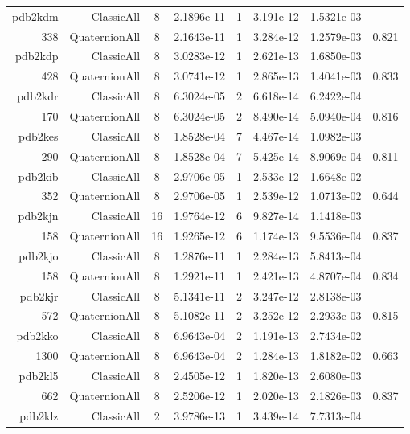 \begin{xltabular}{\textwidth}{r|rcS[table-format=1.4e+2]cS[table-format=1.3e+2]S[table-format=1.4e+2]S[table-format=-1.3]}
pdb2kdm & ClassicAll & 8 & 2.1896e-11 & 1 & 3.191e-12 & 1.5321e-03 & \\
338 & QuaternionAll & 8 & 2.1643e-11 & 1 & 3.284e-12 & 1.2579e-03 & 0.821\\  \addlinespace
pdb2kdp & ClassicAll & 8 & 3.0283e-12 & 1 & 2.621e-13 & 1.6850e-03 & \\
428 & QuaternionAll & 8 & 3.0741e-12 & 1 & 2.865e-13 & 1.4041e-03 & 0.833\\  \addlinespace
pdb2kdr & ClassicAll & 8 & 6.3024e-05 & 2 & 6.618e-14 & 6.2422e-04 & \\
170 & QuaternionAll & 8 & 6.3024e-05 & 2 & 8.490e-14 & 5.0940e-04 & 0.816\\  \addlinespace
pdb2kes & ClassicAll & 8 & 1.8528e-04 & 7 & 4.467e-14 & 1.0982e-03 & \\
290 & QuaternionAll & 8 & 1.8528e-04 & 7 & 5.425e-14 & 8.9069e-04 & 0.811\\  \addlinespace
pdb2kib & ClassicAll & 8 & 2.9706e-05 & 1 & 2.533e-12 & 1.6648e-02 & \\
352 & QuaternionAll & 8 & 2.9706e-05 & 1 & 2.539e-12 & 1.0713e-02 & 0.644\\  \addlinespace
pdb2kjn & ClassicAll & 16 & 1.9764e-12 & 6 & 9.827e-14 & 1.1418e-03 & \\
158 & QuaternionAll & 16 & 1.9265e-12 & 6 & 1.174e-13 & 9.5536e-04 & 0.837\\  \addlinespace
pdb2kjo & ClassicAll & 8 & 1.2876e-11 & 1 & 2.284e-13 & 5.8413e-04 & \\
158 & QuaternionAll & 8 & 1.2921e-11 & 1 & 2.421e-13 & 4.8707e-04 & 0.834\\  \addlinespace
pdb2kjr & ClassicAll & 8 & 5.1341e-11 & 2 & 3.247e-12 & 2.8138e-03 & \\
572 & QuaternionAll & 8 & 5.1082e-11 & 2 & 3.252e-12 & 2.2933e-03 & 0.815\\  \addlinespace
pdb2kko & ClassicAll & 8 & 6.9643e-04 & 2 & 1.191e-13 & 2.7434e-02 & \\
1300 & QuaternionAll & 8 & 6.9643e-04 & 2 & 1.284e-13 & 1.8182e-02 & 0.663\\  \addlinespace
pdb2kl5 & ClassicAll & 8 & 2.4505e-12 & 1 & 1.820e-13 & 2.6080e-03 & \\
662 & QuaternionAll & 8 & 2.5206e-12 & 1 & 2.020e-13 & 2.1826e-03 & 0.837\\  \addlinespace
pdb2klz & ClassicAll & 2 & 3.9786e-13 & 1 & 3.439e-14 & 7.7313e-04 & \\

\end{xltabular}
